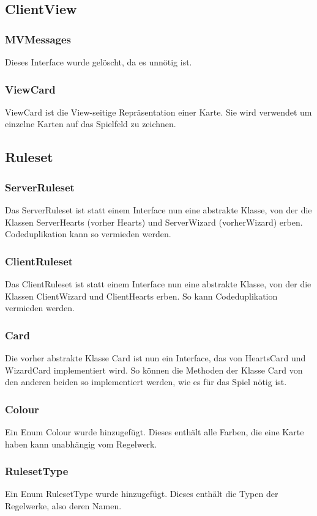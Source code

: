 \documentclass[twoside]{article}
\begin{document}
\subsection{ClientView}
\subsubsection{MVMessages}
Dieses Interface wurde gelöscht, da es unnötig ist.
\subsubsection{ViewCard}
ViewCard ist die View-seitige Repräsentation einer Karte. Sie wird verwendet um einzelne Karten auf das Spielfeld zu zeichnen.
\subsection{Ruleset}
\subsubsection{ServerRuleset}
Das ServerRuleset ist statt einem Interface nun eine abstrakte Klasse, von der die Klassen ServerHearts (vorher Hearts) und ServerWizard (vorherWizard) erben. Codeduplikation kann so vermieden werden.
\subsubsection{ClientRuleset}
Das ClientRuleset ist statt einem Interface nun eine abstrakte Klasse, von der die Klassen ClientWizard und ClientHearts erben. So kann Codeduplikation vermieden werden.
\subsubsection{Card}
Die vorher abstrakte Klasse Card ist nun ein Interface, das von HeartsCard und WizardCard implementiert wird. So können die Methoden der Klasse Card von den anderen beiden so implementiert werden, wie es für das Spiel nötig ist.
\subsubsection{Colour}
Ein Enum Colour wurde hinzugefügt. Dieses enthält alle Farben, die eine Karte haben kann unabhängig vom Regelwerk.
\subsubsection{RulesetType}
Ein Enum RulesetType wurde hinzugefügt. Dieses enthält die Typen der Regelwerke, also deren Namen. 
\end{document}
